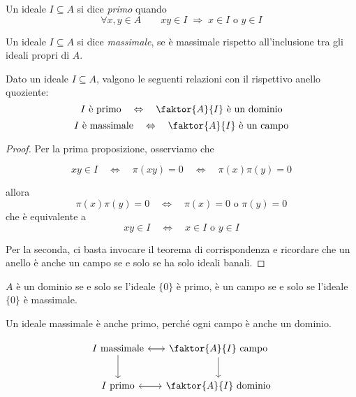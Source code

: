 \begin{multicols}{2}
\begin{definition}
	Un ideale $ I \subseteq A $ si dice \emph{primo} quando
	\[ \forall x, y \in A \qquad xy \in I \;\Rightarrow\; x \in I \text{ o } y \in I \]
\end{definition}

\begin{definition}
	Un ideale $ I \subseteq A $ si dice \emph{massimale}, se è massimale rispetto all'inclusione tra gli ideali propri di $ A $.
\end{definition}

\begin{theorem}\label{idealequoziente}
	Dato un ideale $ I \subseteq A $, valgono le seguenti relazioni con il rispettivo anello quoziente:
	\[ I \text{ è primo} \quad\Leftrightarrow\quad \faktor{A}{I} \text{ è  un dominio} \]
	\[ I \text{ è massimale} \quad\Leftrightarrow\quad \faktor{A}{I} \text{ è un campo} \]
\end{theorem}

\begin{proof}
	Per la prima proposizione, osserviamo che
	
	\[xy \in I \quad\Leftrightarrow\quad \pi(xy) = 0 
	\quad\Leftrightarrow\quad \pi(x)\pi(y) = 0 \]
	
	allora
	\[ \pi(x)\pi(y) = 0 \quad\Leftrightarrow\quad \pi(x) =0 \text{ o } \pi(y) = 0   \]
	che è equivalente a 
	\[ xy \in I \quad\Leftrightarrow\quad x \in I \text{ o } y \in I  \]
	
	Per la seconda, ci basta invocare il teorema di corrispondenza e ricordare che un anello è anche un campo se e solo se ha solo ideali banali.
\end{proof}

\begin{remark}
	$ A $ è un dominio se e solo se l'ideale $ \{0\} $ è primo, è un campo se e solo se l'ideale $ \{0\} $ è massimale.
\end{remark}
\begin{remark}
	Un ideale massimale è anche primo, perché ogni campo è anche un dominio.
\end{remark}

\[ \begin{tikzcd}[row sep=0.75cm, column sep=0.5 cm]
I \text{ massimale} \arrow{r} \arrow[swap]{d} &  \faktor{A}{I} \text{ campo} \arrow{l} \arrow[swap]{d} \\
I \text{ primo} \arrow{r}  &  \faktor{A}{I} \text{ dominio} \arrow{l}
\end{tikzcd} \]


\end{multicols}
